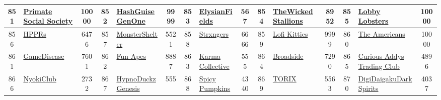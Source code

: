 \begin{table*}[]
{\begin{tabular}{|c|l|c|c|l|c|c|l|c|c|l|c|c|l|c|}
        851   & \href{https://www.primatesocialsociety.com/}{Primate Social Society}               & 10000             & 852   & \href{https://hashguise.com}{HashGuiseGenOne}                                                     & 9999              & 853   & \href{https://forgottenrunes.com}{ElysianFields}                                  & 567               & 854   & \href{https://opensea.io/collection/wickedstallions}{TheWickedStallions}      & 8952              & 855   & \href{http://Universe.xyz}{Lobby Lobsters}                                                & 10000                                   \\ \hline
        856   & \href{https://hoppersnft.xyz}{HPPRs}                                               & 6476              & 857   & \href{http://monstershelter.io}{MonsterShelter}                                                   & 5521              & 858   & \href{https://strxngers.me}{Strxngers}                                            & 6666              & 859   & \href{https://opensea.io/collection/lofikitties}{Lofi Kitties}                & 9999              & 860   & \href{http://theamericans.io}{The Americans}                                              & 10000                                   \\ \hline
        861   & \href{https://thegamedisease.com}{GameDisease}                                     & 7601              & 862   & \href{https://funapes.io/}{Fun Apes}                                                              & 8887              & 863   & \href{https://dapperdinos.com}{Karma Collective}                                  & 555               & 864   & \href{https://www.br0ads1de.com/}{Broadside}                                  & 7290              & 865   & \href{http://curiousaddys.com}{Curious Addys Trading Club}                                & 4896                                    \\ \hline
        866   & \href{https://nyokiclub.com}{NyokiClub}                                            & 2732              & 867   & \href{http://hypnoduckz.com}{HypnoDuckzGenesis}                                                   & 555               & 868   & \href{https://opensea.io/collection/spicy-pumpkins}{Spicy Pumpkins}               & 4340              & 869   & \href{http://torix.io}{TORIX}                                                 & 5563              & 870   & \href{https://digidaigaku.com/}{DigiDaigakuDarkSpirits}                                   & 4037                                    \\ \hline

\end{tabular}}
\end{table*}
